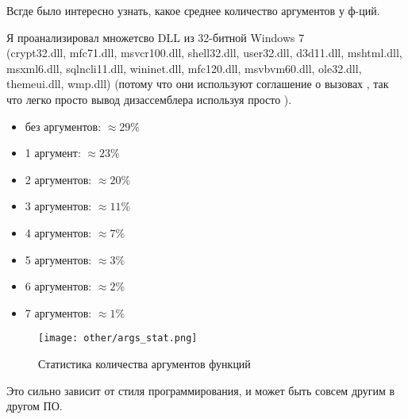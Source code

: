 \label{args_stat}

Всгде было интересно узнать, какое среднее количество аргументов у ф-ций.

Я проанализировал множетсво DLL из 32-битной Windows 7 \\
(crypt32.dll, mfc71.dll, msvcr100.dll, shell32.dll, 
user32.dll, d3d11.dll, mshtml.dll, msxml6.dll, sqlncli11.dll, wininet.dll, mfc120.dll, msvbvm60.dll, ole32.dll, themeui.dll, wmp.dll) 
(потому что они используют соглашение о вызовах , так что легко просто  вывод дизассемблера используя
просто ).

\begin{itemize}
\item без аргументов: $\approx 29\%$
\item 1 аргумент: $\approx 23\%$
\item 2 аргументов: $\approx 20\%$
\item 3 аргументов: $\approx 11\%$
\item 4 аргументов: $\approx 7\%$
\item 5 аргументов: $\approx 3\%$
\item 6 аргументов: $\approx 2\%$
\item 7 аргументов: $\approx 1\%$
\end{itemize}

\begin{figure}[H]
\centering
\texttt{[image: other/args\_stat.png]}
\caption{Статистика количества аргументов функций}
\end{figure}

Это сильно зависит от стиля программирования, и может быть совсем другим в другом ПО.


